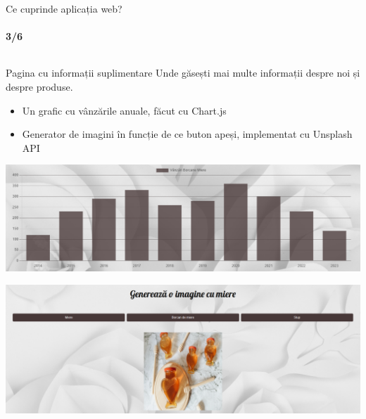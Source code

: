 \documentclass{beamer}
\begin{document}
\begin{darkframes}
		\begin{frame}[label=math]{Ce cuprinde aplicația web?}
			\vspace{-3em}
			\framesubtitle{3/6}
			\begin{columns}[t]
				\begin{column}{1\textwidth}
					\begin{exampleblock}{Pagina cu informații suplimentare}
						\tiny
						Unde găsești \alert{mai multe informații} despre noi și despre produse.
						\begin{itemize}
							\item Un grafic cu vânzările anuale, făcut cu Chart.js
							\item Generator de imagini în funcție de ce buton apeși, implementat cu Unsplash API
						\end{itemize}
					\end{exampleblock}
					\vspace{1em}
					\begin{center}
						\begin{minipage}[t]{0.49\textwidth}
							\centering
							\includegraphics[width=\textwidth]{grafic.png}
						\end{minipage}
						\hfill
						\begin{minipage}[t]{0.49\textwidth}
							\centering
							\includegraphics[width=\textwidth]{generator.png}
						\end{minipage}
						
						\vspace{0.5em}
						

\end{center}
\end{column}
\end{columns}
\end{frame}
\end{darkframes}
\end{document}
